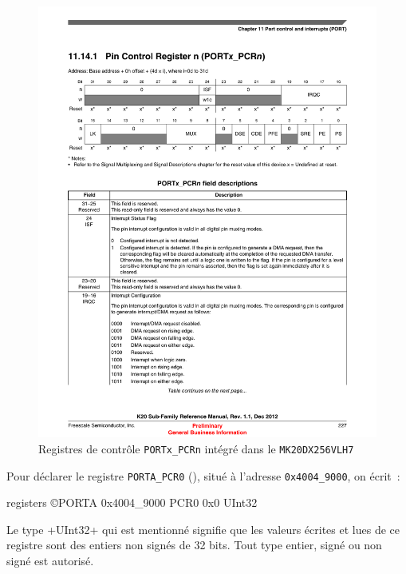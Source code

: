 \begin{figure}[htbp]
\centering
\includegraphics[width=14cm]{chapitres/PORTx_PCRn.pdf}
\caption{Registres de contrôle \texttt{PORTx\_PCRn} intégré dans le \texttt{MK20DX256VLH7}}
\end{figure}









Pour déclarer le registre \texttt{PORTA\_PCR0} (), situé à l'adresse \texttt{0x4004\_9000}, on écrit~:

\begin{OMNIBUS}
registers ©PORTA 0x4004_9000 {
  PCR0 0x0 UInt32
}
\end{OMNIBUS}

Le type \omnibus+UInt32+ qui est mentionné signifie que les valeurs écrites et lues de ce registre sont des entiers non signés de 32 bits. Tout type entier, signé ou non signé est autorisé.

